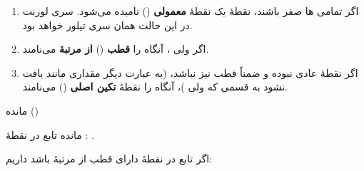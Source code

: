 \begin{enumerate}
\def\labelenumi{\arabic{enumi}.}
\tightlist
\item
  اگر تمامی  ها صفر باشند، نقطهٔ  یک نقطهٔ \textbf{معمولی} () نامیده می‌شود. سری لورنت در این حالت همان سری تیلور خواهد بود.
\item
  اگر  ولی ، آنگاه  را \textbf{قطب} () \textbf{از مرتبهٔ } می‌نامند.
\item
  اگر  نقطهٔ عادی نبوده و ضمناً قطب نیز نباشد، (به عبارت دیگر مقداری مانند  یافت نشود به قسمی که  ولی )، آنگاه  را نقطهٔ \textbf{تکین اصلی} () می‌نامند.
\end{enumerate}

\EMhold


\begin{EMdefinition}{مانده ()}

مانده تابع  در نقطهٔ : .

\end{EMdefinition}

\begin{EMtheorem}{}

اگر تابع  در نقطهٔ  دارای قطب از مرتبهٔ  باشد داریم:

\end{EMtheorem}

